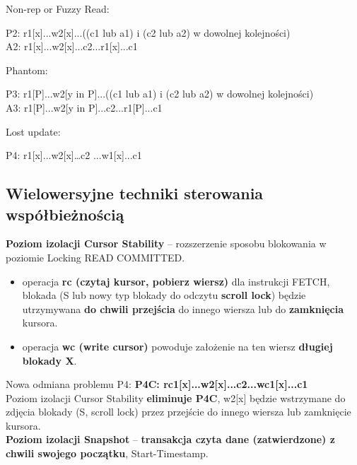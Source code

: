 \documentclass[main.tex]{subfiles}
\begin{document}
    \noindent Non-rep or Fuzzy Read:
    \begin{center}
        P2: r1[x]...w2[x]...((c1 lub a1) i (c2 lub a2) w dowolnej kolejności)\\
        A2: r1[x]...w2[x]...c2...r1[x]...c1\\
    \end{center}


    \noindent Phantom:
    \begin{center}
        P3: r1[P]...w2[y in P]...((c1 lub a1) i (c2 lub a2) w dowolnej kolejności)\\
        A3: r1[P]...w2[y in P]...c2...r1[P]...c1\\
    \end{center}


    \noindent Lost update:
    \begin{center}
        P4: r1[x]...w2[x]…c2 ...w1[x]...c1
    \end{center}

    \subsection{Wielowersyjne techniki sterowania współbieżnością}

    \textbf{Poziom izolacji Cursor Stability} -- rozszerzenie sposobu blokowania w poziomie Locking READ COMMITTED.
    \begin{itemize}[noitemsep]
        \item operacja \textbf{rc (czytaj kursor, pobierz wiersz)} dla instrukcji FETCH, blokada (S lub nowy typ
        blokady do odczytu \textbf{scroll lock}) będzie utrzymywana \textbf{do chwili przejścia} do innego wiersza lub
        do \textbf{zamknięcia} kursora.
        \item operacja \textbf{wc (write cursor)} powoduje założenie na ten wiersz \textbf{długiej blokady X}.
    \end{itemize}

    Nowa odmiana problemu P4:
    \textbf{P4C: rc1[x]...w2[x]...c2...wc1[x]...c1}\\

    \noindent Poziom izolacji Cursor Stability \textbf{eliminuje P4C}, w2[x] będzie wstrzymane do zdjęcia blokady (S, scroll lock) przez przejście do innego wiersza lub zamknięcie kursora.\\

    \noindent \textbf{Poziom izolacji Snapshot} -- \textbf{transakcja czyta dane (zatwierdzone) z chwili swojego początku}, Start-Timestamp.
\end{document}
